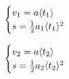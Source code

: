 \begin{equation} \begin{cases}v_{1}=a\langle t_{1}\rangle\\ s=\frac{1}{2}a_{1}\langle t_{1}\rangle^{2}\\ \end{cases}\ \\  \end{equation}

\begin{equation} \begin{cases}v_{2}=a\langle t_{2}\rangle\\ s=\frac{1}{2}a_{2}\langle t_{2}\rangle^{2}\\ \end{cases}\ \\  \end{equation}
